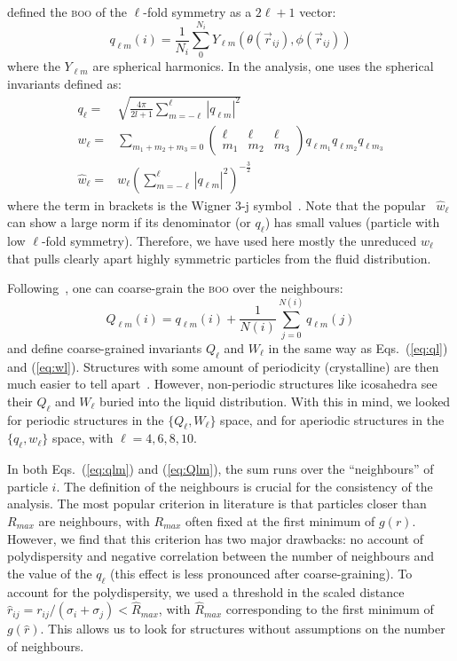 \citet{steinhardt1983boo} defined the \textsc{boo} of the $\ell$-fold symmetry as a $2\ell+1$ vector:
\begin{equation}
	q_{\ell m}(i) = \frac{1}{N_i}\sum_{0}^{N_i} Y_{\ell m}(\theta(\vec r_{ij}),\phi(\vec r_{ij}))
	\label{eq:qlm}
\end{equation}
where the $Y_{\ell m}$ are spherical harmonics. In the analysis, one uses the spherical invariants defined as:
\begin{align}
	q_\ell =& \sqrt{\frac{4\pi}{2l+1} \sum_{m=-\ell}^{\ell} |q_{\ell m}|^2 }\label{eq:ql}\\
	w_\ell =& \sum_{m_1+m_2+m_3=0} 
			\left( \begin{array}{ccc}
				\ell & \ell & \ell \\
				m_1 & m_2 & m_3 
			\end{array} \right)
			q_{\ell m_1} q_{\ell m_2} q_{\ell m_3} \label{eq:wl}\\
	\hat{w}_\ell =& w_\ell{\left( \sum_{m=-\ell}^{\ell} |q_{\ell m}|^2 \right)}^{-\frac{3}{2}}
\end{align}
where the term in brackets is the Wigner 3-j symbol~\citep{Landau1965}. Note that the popular~\citep{vanblaaderen1995rss,ReintenWolde1996,Lechner2008} $\hat{w}_\ell$ can show a large norm if its denominator (or $q_\ell$) has small values (particle with low $\ell$-fold symmetry). Therefore, we have used here mostly the unreduced $w_\ell$ that pulls clearly apart highly symmetric particles from the fluid distribution.

Following~\citet{Lechner2008}, one can coarse-grain the \textsc{boo} over the neighbours:
\begin{equation}
	Q_{\ell m}(i) = q_{\ell m}(i) + \frac{1}{N(i)} \sum_{j=0}^{N(i)} q_{\ell m}(j)
	\label{eq:Qlm}
\end{equation}
and define coarse-grained invariants $Q_\ell$ and $W_\ell$ in the same way as Eqs.~(\ref{eq:ql}) and (\ref{eq:wl}). Structures with some amount of periodicity (crystalline) are then much easier to tell apart~\citep{Lechner2008}. However, non-periodic structures like icosahedra see their $Q_\ell$ and $W_\ell$ buried into the liquid distribution. With this in mind, we looked for periodic structures in the $\lbrace Q_\ell, W_\ell\rbrace$ space, and for aperiodic structures in the $\lbrace q_\ell, w_\ell\rbrace$ space, with $\ell=4,6,8,10$.

In both Eqs.~(\ref{eq:qlm}) and (\ref{eq:Qlm}), the sum runs over the ``neighbours'' of particle $i$. The definition of the neighbours is crucial for the consistency of the analysis. The most popular criterion in literature is that particles closer than $R_{max}$ are neighbours, with $R_{max}$ often fixed at the first minimum of $g(r)$. However, we find that this criterion has two major drawbacks: no account of polydispersity and negative correlation between the number of neighbours and the value of the $q_\ell$ (this effect is less pronounced after coarse-graining). To account for the polydispersity, we used a threshold in the scaled distance $\hat{r}_{i j} = r_{i j} /(\sigma_i+\sigma_j) < \hat{R}_{max}$, with $\hat{R}_{max}$ corresponding to the first minimum of $g(\hat{r})$. This allows us to look for structures without assumptions on the number of neighbours. 

